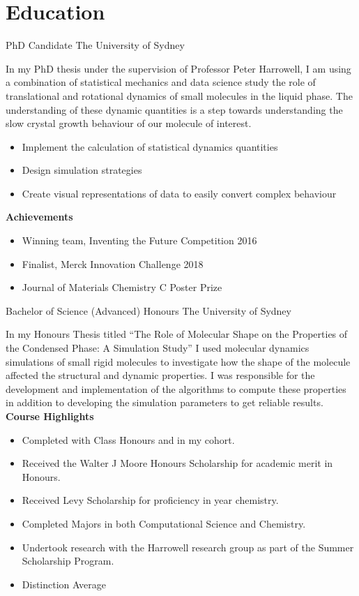 



\makecvtitle{}

\vspace{-4em}
\section{Education}

{PhD Candidate}
{The University of Sydney}{}{}
{%
In my PhD thesis under the supervision of Professor Peter Harrowell,
I am using a combination of
statistical mechanics and data science
study the role of translational and rotational dynamics
of small molecules in the liquid phase.
The understanding of these dynamic quantities is a step
towards understanding the slow crystal growth behaviour of
our molecule of interest.
\begin{itemize}
  \item Implement the calculation of statistical dynamics quantities
  \item Design simulation strategies
  \item Create visual representations of data to easily convert complex behaviour
\end{itemize}
\textbf{Achievements}
\begin{itemize}
  \item Winning team, Inventing the Future Competition 2016
  \item Finalist, Merck Innovation Challenge 2018
  \item Journal of Materials Chemistry C Poster Prize
\end{itemize}
}
\vspace{1em}


{Bachelor of Science (Advanced) Honours}
{The University of Sydney}{}{}
{%
In my Honours Thesis titled
``The Role of Molecular Shape on the Properties of the Condensed Phase: A Simulation Study''
I used molecular dynamics simulations of small rigid molecules to investigate how
the shape of the molecule affected the structural and dynamic properties.
I was responsible for the development and implementation of the algorithms to
compute these properties in addition to developing the simulation parameters
to get reliable results.
\textbf{Course Highlights}
\begin{itemize}
  \item Completed with  Class Honours and  in my cohort.
  \item Received the Walter J Moore Honours Scholarship for academic merit in Honours.
  \item Received Levy Scholarship for proficiency in  year chemistry.
  \item Completed Majors in both Computational Science and Chemistry.
  \item Undertook research with the Harrowell research group as part of the Summer Scholarship Program.
  \item Distinction Average
\end{itemize}
}
\vspace{1em}

